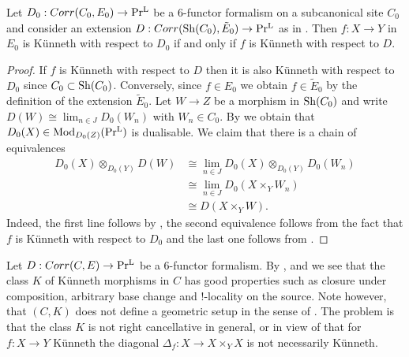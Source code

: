 \begin{lemma}\label{Künneth remains künneth under extension}
  Let $D_0 : Corr(C_0,E_0) \to \operatorname{Pr^{L}}$ be a $6$-functor formalism  on a subcanonical site $C_0$ and consider an extension $D : Corr(\operatorname{Sh}(C_0), \tilde{E}_0) \to \operatorname{Pr^{L}}$ as in . Then $f : X \to Y$ in $E_0$ is Künneth with respect to $D_0$ if and only if $f$ is Künneth with respect to $D$.
\end{lemma}
\begin{proof}
If $f$ is Künneth with respect to $D$ then it is also Künneth with respect to $D_0$ since $C_0 \subset \operatorname{Sh}(C_0)$. Conversely, since $f\in E_0$ we obtain $f\in \tilde{E}_0$ by the definition of the extension $\tilde{E}_0$. Let $W \to Z$ be a morphism in $\operatorname{Sh}(C_0)$ and write $D(W) \cong \lim_{n\in J} D_0(W_n)$ with $W_n\in C_0$. By  we obtain that $D_0(X) \in \operatorname{Mod}_{D_0(Z)}(\operatorname{Pr^{L}})$ is dualisable.  We claim that there is a chain of equivalences
\begin{align*}
D_0(X) \otimes_{D_0(Y)}D(W) & \cong \lim_{n\in J}D_0(X) \otimes_{D_0(Y)}D_0(W_n) \\
& \cong \lim_{n\in J} D_0(X\times_Y W_n) \\
& \cong D(X \times_Y W).
\end{align*}
Indeed, the first line follows by , the second equivalence follows from the fact that $f$ is Künneth with respect to $D_0$ and the last one follows from .
\end{proof}

\begin{remark}\label{remark diagobal and rightcancellativenenss}
Let $D : Corr(C,E) \to \operatorname{Pr^{L}}$ be a $6$-functor formalism. By , and  we see that the class $K$ of Künneth morphisms in $C$ has good properties such as closure under composition, arbitrary base change and $!$-locality on the source. Note however, that $(C,K)$ does not define a geometric setup in the sense of \Cite[Definition 2.1.1]{heyer20246}. The problem is that the class $K$ is not right cancellative in general, or in view of \Cite[Remark 2.1.2]{heyer20246} that for $f: X \to Y$ Künneth the diagonal $\Delta_f: X \to X\times_Y X$ is not necessarily Künneth. 
\end{remark}

